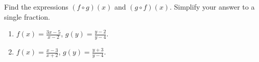 Find the expressions $(f\circ g)(x)$ and $(g\circ f)(x)$. Simplify your answer to a single fraction. 
\begin{enumerate}
\item $\displaystyle  f(x)= \frac{3x-5}{x-2}$, $\displaystyle g(y)=\frac{y-2 }{y-4} $. 
\item $\displaystyle  f(x)= \frac{x-3}{x+2}$, $\displaystyle g(y)=\frac{y+3 }{y-4} $. 
\end{enumerate}
